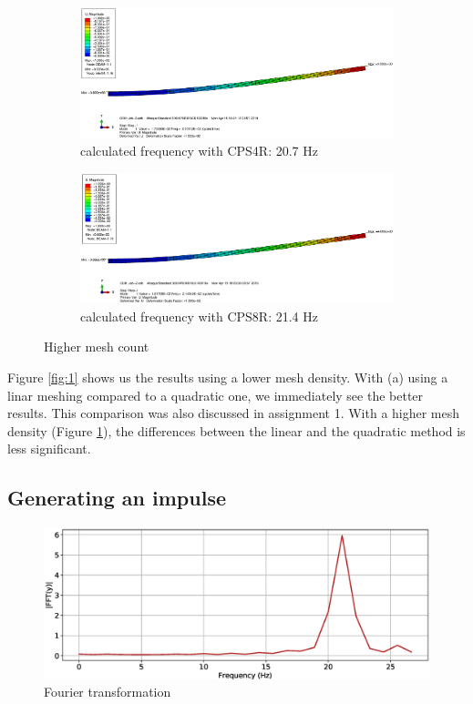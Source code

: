 \documentclass[12pt]{article}
\begin{document}
\begin{figure}[!htb]
  \centering
  \begin{subfigure}{.5\textwidth}
    \centering
    \includegraphics[width=0.95\linewidth]{pics/Beam_1_CPS4R_L}
    \caption{calculated frequency with CPS4R: 20.7 Hz}
  \end{subfigure}%
  \begin{subfigure}{.5\textwidth}
    \centering
    \includegraphics[width=0.95\linewidth]{pics/Beam_1_CPS8R_L}
    \caption{calculated frequency with CPS8R: 21.4 Hz}
   \end{subfigure}
  \caption{Higher mesh count}
  \label{fig:2}
\end{figure}

\noindent Figure \ref{fig:1} shows us the results using a lower mesh density. With (a) using a linar meshing compared to a quadratic one,
we immediately see the better results. This comparison was also discussed in assignment 1. With a higher mesh density (Figure \ref{fig:2}),
the differences between the linear and the quadratic method is less significant.
\newpage
\subsection{Generating an impulse}

\begin{figure}[!htb]
  \centering
  \includegraphics[width=0.95\linewidth]{pics/Report2}
  \caption{Fourier transformation}
\end{figure}
\end{document}
